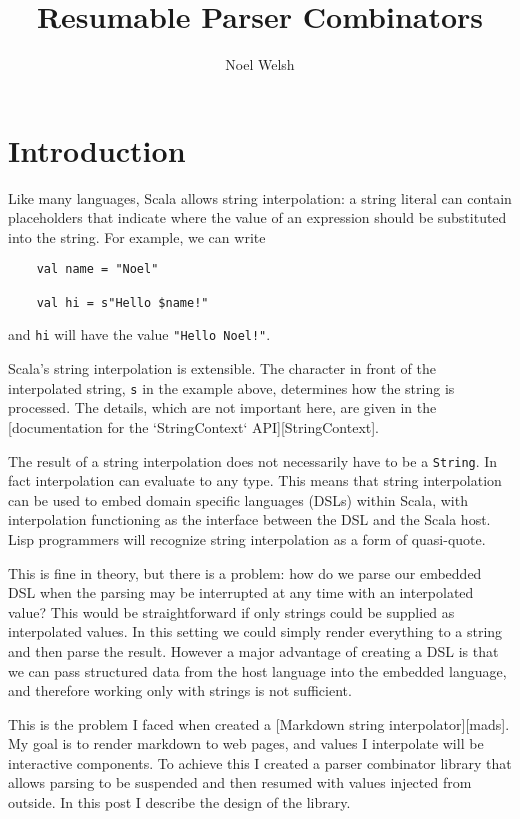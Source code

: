 \documentclass[sigplan,screen,review]{acmart}
\begin{document}
  \lstset{language=Scala, basicstyle=\small}
  \title{Resumable Parser Combinators}
  \author{Noel Welsh}

  \maketitle

  \section{Introduction}
  Like many languages, Scala allows string interpolation: a string literal can contain placeholders that indicate where the value of an expression should be substituted into the string. For example, we can write

  \begin{lstlisting}
    val name = "Noel"

    val hi = s"Hello $name!"
  \end{lstlisting}

  and \texttt{hi} will have the value \texttt{"Hello Noel!"}.

  Scala's string interpolation is extensible. The character in front of the interpolated string, \texttt{s} in the example above, determines how the string is processed. The details, which are not important here, are given in the [documentation for the `StringContext` API][StringContext].

  The result of a string interpolation does not necessarily have to be a \texttt{String}. In fact interpolation can evaluate to any type. This means that string interpolation can be used to embed domain specific languages (DSLs) within Scala, with interpolation functioning as the interface between the DSL and the Scala host. Lisp programmers will recognize string interpolation as a form of quasi-quote.

  This is fine in theory, but there is a problem: how do we parse our embedded DSL when the parsing may be interrupted at any time with an interpolated value? This would be straightforward if only strings could be supplied as interpolated values. In this setting we could simply render everything to a string and then parse the result. However a major advantage of creating a DSL is that we can pass structured data from the host language into the embedded language, and therefore working only with strings is not sufficient.

  This is the problem I faced when created a [Markdown string interpolator][mads]. My goal is to render markdown to web pages, and values I interpolate will be interactive components. To achieve this I created a parser combinator library that allows parsing to be suspended and then resumed with values injected from outside. In this post I describe the design of the library.
\end{document}
